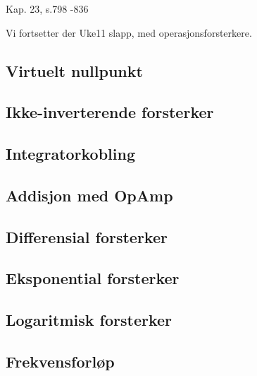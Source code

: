 Kap. 23, s.798 -836

Vi fortsetter der Uke11 slapp, med operasjonsforsterkere.

\subsection{Virtuelt nullpunkt}
  
\subsection{Ikke-inverterende forsterker}
  
\subsection{Integratorkobling}
  
\subsection{Addisjon med OpAmp}
  
\subsection{Differensial forsterker}
  
\subsection{Eksponential forsterker}
  
\subsection{Logaritmisk forsterker}
  
\subsection{Frekvensforløp}
  

